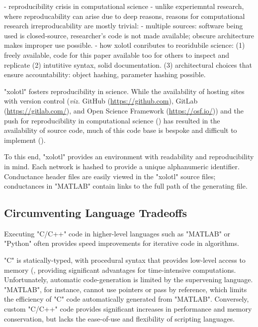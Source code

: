 \documentclass{frontiersSCNS} %
\newcommand{\viz}{\textit{viz.}\xspace}
\begin{document}
- reproducibility crisis in computational science 
- unlike experiemntal research, where reproducability can arise due to deep reasons, reasons for computational research irreproducability are mostly trivial: 
- multiple sources: software being used is closed-source, researcher's code is not made available; obscure architecture makes improper use possible. 
- how xolotl conributes to reoridubile science: (1) freely available, code for this paper available too for others to inspect and replicate (2) intutitive syntax, solid documentation. (3) architectural choices that ensure accountability: object hashing, parameter hashing possible. 


"xolotl" fosters reproducibility in science. While the availability of hosting sites with version control (\viz GitHub (\url{https://github.com}), GitLab (\url{https://gitlab.com/}), and Open Science Framework (\url{https://osf.io/})) and the push for reproducibility in computational science (\cite{eklundClusterFailureWhy2016, stoddenEnhancingReproducibilityComputational2016, bakerWhyScientistsMust2016}) has resulted in the availability of source code, much of this code base is bespoke and difficult to implement (\cite{sedanoCodeReadabilityTesting2016, xuMeasurementSourceCode2017}).

To this end, "xolotl" provides an environment with readability and reproducibility in mind. Each network is hashed to provide a unique alphanumeric identifier. Conductance header files are easily viewed in the "xolotl" source files; conductances in "MATLAB" contain links to the full path of the generating file.

\subsection{Circumventing Language Tradeoffs}

Executing "C/C++" code in higher-level languages such as "MATLAB" or "Python" often provides speed improvements for iterative code in algorithms. 

"C" is statically-typed, with procedural syntax that provides low-level access to memory (\cite{kernighanProgrammingLanguage1978}, providing significant advantages for time-intensive computations. Unfortunately, automatic code-generation is limited by the supervening language. "MATLAB", for instance, cannot use pointers or pass by reference, which limits the efficiency of "C" code automatically generated from "MATLAB". Conversely, custom "C/C++" code provides significant increases in performance and memory conservation, but lacks the ease-of-use and flexibility of scripting languages.
\end{document}
